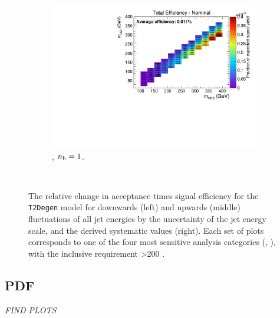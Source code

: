 \begin{figure}[ht!]
\begin{subfigure}[b]{0.32\textwidth}
    \includegraphics[width=\textwidth, page=6]{Figs/sms/t2degen/v5/JES_T2_4body_v5_eq1b_ge4j_incl.pdf}
    \caption{\njhigh, $n_{\text{b}} = 1$.}
    \label{fig:sms-jes-tdegen-ge4j-1b}
  \end{subfigure}\\
  \caption{The relative change in acceptance times signal efficiency for the
  \texttt{T2Degen} model for downwards (left) and upwards (middle) fluctuations
  of all jet energies by the uncertainty of the jet energy scale, and the 
  derived systematic values (right). Each set of plots corresponds to one of
  the four most sensitive analysis categories (\nb, \nj), with the inclusive 
  requirement \HT>200 \gev.}
  \label{fig:sms-jes-t2degen}
\end{figure}


\newpage
\subsection*{PDF}
\label{sec:t2degen_pdf_plots}
\emph{FIND PLOTS}




